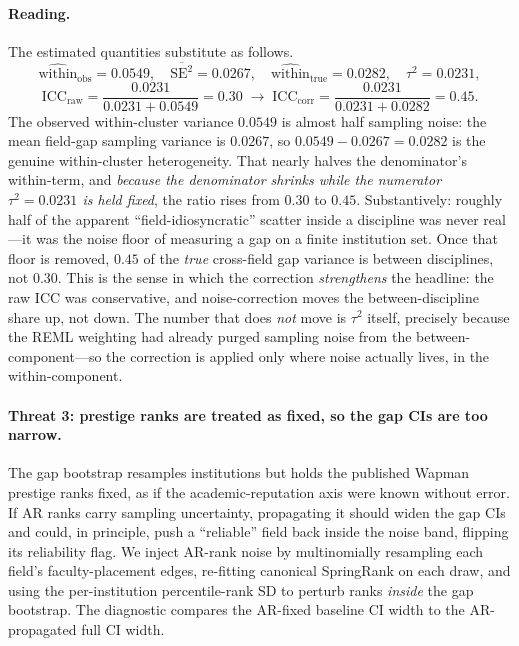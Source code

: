 \documentclass[11pt]{article}
\begin{document}
\paragraph{Reading.} The estimated quantities substitute as follows.
\[
\widehat{\text{within}}_{\text{obs}}=0.0549,\quad \overline{\mathrm{SE}^2}=0.0267,\quad \widehat{\text{within}}_{\text{true}}=0.0282,\quad \tau^2=0.0231,
\]
\[
\mathrm{ICC}_{\text{raw}}=\frac{0.0231}{0.0231+0.0549}=0.30 \;\longrightarrow\; \mathrm{ICC}_{\text{corr}}=\frac{0.0231}{0.0231+0.0282}=0.45 .
\]
The observed within-cluster variance $0.0549$ is almost half sampling noise: the mean field-gap sampling variance is $0.0267$, so $0.0549-0.0267=0.0282$ is the genuine within-cluster heterogeneity. That nearly halves the denominator's within-term, and \emph{because the denominator shrinks while the numerator $\tau^2=0.0231$ is held fixed}, the ratio rises from $0.30$ to $0.45$. Substantively: roughly half of the apparent ``field-idiosyncratic'' scatter inside a discipline was never real---it was the noise floor of measuring a gap on a finite institution set. Once that floor is removed, $0.45$ of the \emph{true} cross-field gap variance is between disciplines, not $0.30$. This is the sense in which the correction \emph{strengthens} the headline: the raw ICC was conservative, and noise-correction moves the between-discipline share up, not down. The number that does \emph{not} move is $\tau^2$ itself, precisely because the REML weighting had already purged sampling noise from the between-component---so the correction is applied only where noise actually lives, in the within-component.

\paragraph{Threat 3: prestige ranks are treated as fixed, so the gap CIs are too narrow.}
The gap bootstrap resamples institutions but holds the published Wapman prestige ranks fixed, as if the academic-reputation axis were known without error. If AR ranks carry sampling uncertainty, propagating it should widen the gap CIs and could, in principle, push a ``reliable'' field back inside the noise band, flipping its reliability flag. We inject AR-rank noise by multinomially resampling each field's faculty-placement edges, re-fitting canonical SpringRank on each draw, and using the per-institution percentile-rank SD to perturb ranks \emph{inside} the gap bootstrap. The diagnostic compares the AR-fixed baseline CI width to the AR-propagated full CI width.
\end{document}
